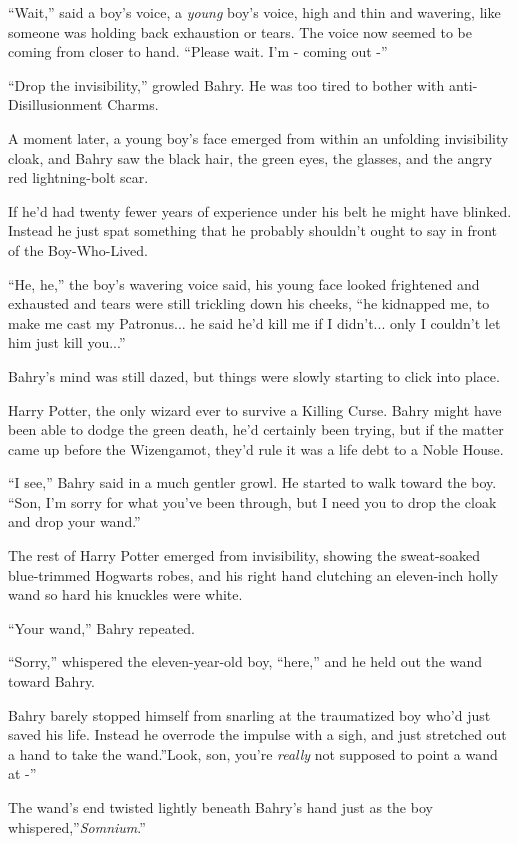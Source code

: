 ``Wait,'' said a boy's voice, a \emph{young} boy's voice, high and thin
and wavering, like someone was holding back exhaustion or tears. The
voice now seemed to be coming from closer to hand. ``Please wait. I'm -
coming out -''

``Drop the invisibility,'' growled Bahry. He was too tired to bother
with anti-Disillusionment Charms.

A moment later, a young boy's face emerged from within an unfolding
invisibility cloak, and Bahry saw the black hair, the green eyes, the
glasses, and the angry red lightning-bolt scar.

If he'd had twenty fewer years of experience under his belt he might
have blinked. Instead he just spat something that he probably shouldn't
ought to say in front of the Boy-Who-Lived.

``He, he,'' the boy's wavering voice said, his young face looked
frightened and exhausted and tears were still trickling down his cheeks,
``he kidnapped me, to make me cast my Patronus... he said he'd kill
me if I didn't... only I couldn't let him just kill you...''

Bahry's mind was still dazed, but things were slowly starting to click
into place.

Harry Potter, the only wizard ever to survive a Killing Curse. Bahry
might have been able to dodge the green death, he'd certainly been
trying, but if the matter came up before the Wizengamot, they'd rule it
was a life debt to a Noble House.

``I see,'' Bahry said in a much gentler growl. He started to walk toward
the boy. ``Son, I'm sorry for what you've been through, but I need you
to drop the cloak and drop your wand.''

The rest of Harry Potter emerged from invisibility, showing the
sweat-soaked blue-trimmed Hogwarts robes, and his right hand clutching
an eleven-inch holly wand so hard his knuckles were white.

``Your wand,'' Bahry repeated.

``Sorry,'' whispered the eleven-year-old boy, ``here,'' and he held out
the wand toward Bahry.

Bahry barely stopped himself from snarling at the traumatized boy who'd
just saved his life. Instead he overrode the impulse with a sigh, and
just stretched out a hand to take the wand.''Look, son, you're
\emph{really} not supposed to point a wand at -''

The wand's end twisted lightly beneath Bahry's hand just as the boy
whispered,''\emph{Somnium}.''

